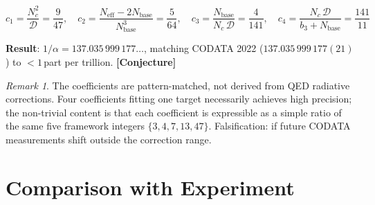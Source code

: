 \documentclass[12pt]{article}
\theoremstyle{definition}
\theoremstyle{remark}
\newtheorem{remark}{Remark}[section]
\newcommand{\epi}[1]{\textnormal{{\small\sffamily\bfseries\color{ftdblue}[#1]}}}
\begin{document}
\begin{equation}
c_1 = \frac{N_c^2}{\mathcal{D}} = \frac{9}{47},\quad
c_2 = \frac{N_\text{eff}-2N_\text{base}}{N_\text{base}^3} = \frac{5}{64},\quad
c_3 = \frac{N_\text{base}}{N_c\,\mathcal{D}} = \frac{4}{141},\quad
c_4 = \frac{N_c\,\mathcal{D}}{b_3 + N_\text{base}} = \frac{141}{11}
\end{equation}

\noindent\textbf{Result}: $1/\alpha = 137.035\,999\,177\ldots$, matching CODATA 2022
($137.035\,999\,177(21)$) to $< 1$\,part per trillion. \epi{Conjecture}

\begin{remark}
The coefficients are pattern-matched, not derived from QED radiative corrections.
Four coefficients fitting one target necessarily achieves high precision;
the non-trivial content is that each coefficient is expressible as a simple
ratio of the same five framework integers $\{3,4,7,13,47\}$.
Falsification: if future CODATA measurements shift outside the correction range.
\end{remark}

\section{Comparison with Experiment}
\end{document}
